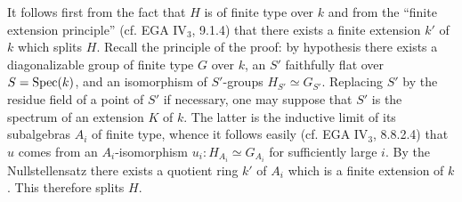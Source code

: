 It follows first from the fact that $H$ is of finite type over $k$ and from the ``finite extension principle'' (cf. EGA IV$_3$, 9.1.4) that there exists a finite extension $k'$ of $k$ which splits $H$. Recall the principle of the proof: by hypothesis there exists a diagonalizable group of finite type $G$ over $k$, an $S'$ faithfully flat over $S=\operatorname{Spec}(k)$, and an isomorphism of $S'$-groups $H_{S'}\simeq G_{S'}$. Replacing $S'$ by the residue field of a point of $S'$ if necessary, one may suppose that $S'$ is the spectrum of an extension $K$ of $k$. The latter is the inductive limit of its subalgebras $A_i$ of finite type, whence it follows easily (cf. EGA IV$_3$, 8.8.2.4) that $u$ comes from an $A_i$-isomorphism $u_i:H_{A_i}\simeq G_{A_i}$ for sufficiently large $i$. By the Nullstellensatz there exists a quotient ring $k'$ of $A_i$ which is a finite extension of $k$. This therefore splits $H$.


